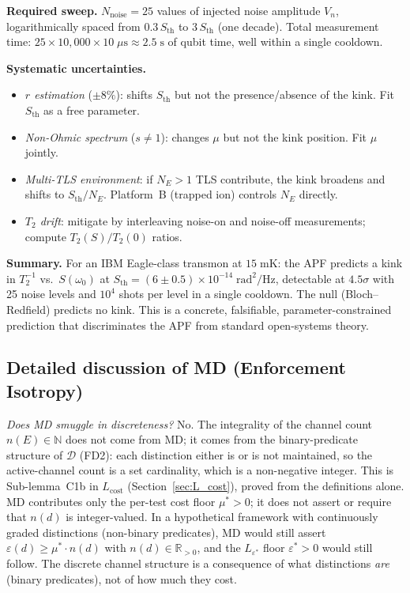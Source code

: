 \documentclass[11pt]{article}
\theoremstyle{remark}
\begin{document}
\smallskip\noindent\textbf{Required sweep.}  $N_{\mathrm{noise}} = 25$ values of injected noise amplitude $V_n$, logarithmically spaced from $0.3\,S_{\mathrm{th}}$ to $3\,S_{\mathrm{th}}$ (one decade).  Total measurement time: $25 \times 10{,}000 \times 10\;\mu\mathrm{s} \approx 2.5\;\mathrm{s}$ of qubit time, well within a single cooldown.

\smallskip\noindent\textbf{Systematic uncertainties.}
\begin{itemize}[nosep,leftmargin=2em]
\item \emph{$r$ estimation} ($\pm 8\%$): shifts $S_{\mathrm{th}}$ but not the presence/absence of the kink.  Fit $S_{\mathrm{th}}$ as a free parameter.
\item \emph{Non-Ohmic spectrum} ($s \ne 1$): changes $\mu$ but not the kink position.  Fit $\mu$ jointly.
\item \emph{Multi-TLS environment}: if $N_E > 1$ TLS contribute, the kink broadens and shifts to $S_{\mathrm{th}}/N_E$.  Platform~B (trapped ion) controls $N_E$ directly.
\item \emph{$T_2$ drift}: mitigate by interleaving noise-on and noise-off measurements; compute $T_2(S)/T_2(0)$ ratios.
\end{itemize}

\smallskip\noindent\textbf{Summary.}  For an IBM Eagle-class transmon at $15\;\mathrm{mK}$: the APF predicts a kink in $T_2^{-1}$ vs.\ $S(\omega_0)$ at $S_{\mathrm{th}} = (6 \pm 0.5) \times 10^{-14}\;\mathrm{rad}^2/\mathrm{Hz}$, detectable at $4.5\sigma$ with 25 noise levels and $10^4$ shots per level in a single cooldown.  The null (Bloch--Redfield) predicts no kink.  This is a concrete, falsifiable, parameter-constrained prediction that discriminates the APF from standard open-systems theory.



\subsection{Detailed discussion of MD (Enforcement Isotropy)}
\label{sec:MD_detail}


\smallskip\noindent\textit{Does MD smuggle in discreteness?}  No.  The integrality of the channel count $n(E) \in \mathbb{N}$ does not come from MD; it comes from the binary-predicate structure of $\mathcal{D}$ (FD2): each distinction either is or is not maintained, so the active-channel count is a set cardinality, which is a non-negative integer.  This is Sub-lemma~C1b in $L_{\mathrm{cost}}$ (Section~\ref{sec:L_cost}), proved from the definitions alone.  MD contributes only the per-test cost floor $\mu^* > 0$; it does not assert or require that $n(d)$ is integer-valued.  In a hypothetical framework with continuously graded distinctions (non-binary predicates), MD would still assert $\varepsilon(d) \ge \mu^* \cdot n(d)$ with $n(d) \in \mathbb{R}_{>0}$, and the $L_{\varepsilon^*}$ floor $\varepsilon^* > 0$ would still follow.  The discrete channel structure is a consequence of what distinctions \emph{are} (binary predicates), not of how much they cost.
\end{document}
